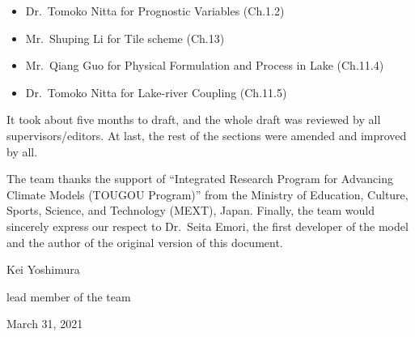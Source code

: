 \begin{itemize}
\item
  Dr.~Tomoko Nitta for Prognostic Variables (Ch.1.2)
\item
  Mr.~Shuping Li for Tile scheme (Ch.13)
\item
  Mr.~Qiang Guo for Physical Formulation and Process in Lake (Ch.11.4)
\item
  Dr.~Tomoko Nitta for Lake-river Coupling (Ch.11.5)
\end{itemize}

It took about five months to draft, and the whole draft was reviewed by
all supervisors/editors. At last, the rest of the sections were amended
and improved by all.

The team thanks the support of ``Integrated Research Program for
Advancing Climate Models (TOUGOU Program)'' from the Ministry of
Education, Culture, Sports, Science, and Technology (MEXT), Japan.
Finally, the team would sincerely express our respect to Dr.~Seita
Emori, the first developer of the model and the author of the original
version of this document.

\begin{flushright}

Kei Yoshimura

lead member of the team

March 31, 2021
\end{flushright}
